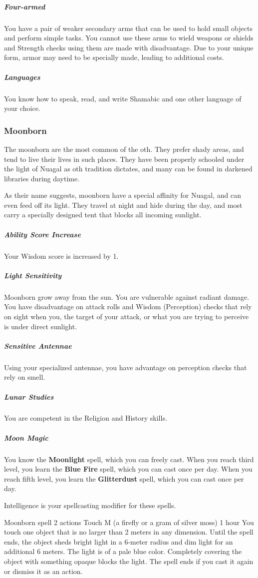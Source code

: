     \subparagraph{Four-armed} You have a pair of weaker secondary arms that can be used to hold small objects and perform simple tasks.
    You cannot use these arms to wield weapons or shields and Strength checks using them are made with disadvantage.
    Due to your unique form, armor may need to be specially made, leading to additional costs.

    \subparagraph{Languages} You know how to speak, read, and write Shamabic and one other language of your choice.

\subsubsection{Moonborn}
    The moonborn are the most common of the oth.
    They prefer shady areas, and tend to live their lives in such places.
    They have been properly schooled under the light of Nuagal as oth tradition dictates, and many can be found in darkened libraries during daytime.

    As their name suggests, moonborn have a special affinity for Nuagal, and can even feed off its light.
    They travel at night and hide during the day, and most carry a specially designed tent that blocks all incoming sunlight.

    \subparagraph{Ability Score Increase} Your Wisdom score is increased by 1.

    \subparagraph{Light Sensitivity} Moonborn grow away from the sun.
    You are vulnerable against radiant damage.
    You have disadvantage on attack rolls and Wisdom (Perception) checks that rely on sight when you, the target of your attack, or what you are trying to perceive is under direct sunlight.

    \subparagraph{Sensitive Antennae} Using your specialized antennae, you have advantage on perception checks that rely on smell.

    \subparagraph{Lunar Studies} You are competent in the Religion and History skills.

    \subparagraph{Moon Magic} You know the \textbf{Moonlight} spell, which you can freely cast.
    When you reach third level, you learn the \textbf{Blue Fire} spell, which you can cast once per day.
    When you reach fifth level, you learn the \textbf{Glitterdust} spell, which you can cast once per day.

    Intelligence is your spellcasting modifier for these spells.

        {Moonborn spell}
        {2 actions}
        {Touch}
        {M (a firefly or a gram of silver moss)}
        {1 hour}
        You touch one object that is no larger than 2 meters in any dimension.
        Until the spell ends, the object sheds bright light in a 6-meter radius and dim light for an additional 6 meters.
        The light is of a pale blue color.
        Completely covering the object with something opaque blocks the light.
        The spell ends if you cast it again or dismiss it as an action.

